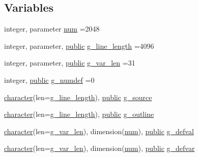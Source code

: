 \subsection*{Variables}
\begin{DoxyCompactItemize}
\item 
integer, parameter \hyperlink{namespacem__fpp_adaa4b6694f65973ef728ad2189a8e6f2}{num} =2048
\item 
integer, parameter, \hyperlink{M__stopwatch_83_8txt_a2f74811300c361e53b430611a7d1769f}{public} \hyperlink{namespacem__fpp_ab93f8756cf248cf8db932573009d4664}{g\+\_\+line\+\_\+length} =4096
\item 
integer, parameter, \hyperlink{M__stopwatch_83_8txt_a2f74811300c361e53b430611a7d1769f}{public} \hyperlink{namespacem__fpp_a99c57ea4a304975a7afafcf0b292db06}{g\+\_\+var\+\_\+len} =31
\item 
integer, \hyperlink{M__stopwatch_83_8txt_a2f74811300c361e53b430611a7d1769f}{public} \hyperlink{namespacem__fpp_a59fae4b75a68fde011c594b60e4b92a5}{g\+\_\+numdef} =0
\item 
\hyperlink{option__stopwatch_83_8txt_abd4b21fbbd175834027b5224bfe97e66}{character}(len=\hyperlink{namespacem__fpp_ab93f8756cf248cf8db932573009d4664}{g\+\_\+line\+\_\+length}), \hyperlink{M__stopwatch_83_8txt_a2f74811300c361e53b430611a7d1769f}{public} \hyperlink{namespacem__fpp_a6e0e464a1765a84236cdda423119523b}{g\+\_\+source}
\item 
\hyperlink{option__stopwatch_83_8txt_abd4b21fbbd175834027b5224bfe97e66}{character}(len=\hyperlink{namespacem__fpp_ab93f8756cf248cf8db932573009d4664}{g\+\_\+line\+\_\+length}), \hyperlink{M__stopwatch_83_8txt_a2f74811300c361e53b430611a7d1769f}{public} \hyperlink{namespacem__fpp_a7d195a44ce2fda4dc4f152fd174f0a86}{g\+\_\+outline}
\item 
\hyperlink{option__stopwatch_83_8txt_abd4b21fbbd175834027b5224bfe97e66}{character}(len=\hyperlink{namespacem__fpp_a99c57ea4a304975a7afafcf0b292db06}{g\+\_\+var\+\_\+len}), dimension(\hyperlink{namespacem__fpp_adaa4b6694f65973ef728ad2189a8e6f2}{num}), \hyperlink{M__stopwatch_83_8txt_a2f74811300c361e53b430611a7d1769f}{public} \hyperlink{namespacem__fpp_a1a99b8d1526c19ed196bc1c1ba53ba4c}{g\+\_\+defval}
\item 
\hyperlink{option__stopwatch_83_8txt_abd4b21fbbd175834027b5224bfe97e66}{character}(len=\hyperlink{namespacem__fpp_a99c57ea4a304975a7afafcf0b292db06}{g\+\_\+var\+\_\+len}), dimension(\hyperlink{namespacem__fpp_adaa4b6694f65973ef728ad2189a8e6f2}{num}), \hyperlink{M__stopwatch_83_8txt_a2f74811300c361e53b430611a7d1769f}{public} \hyperlink{namespacem__fpp_a07ee856eed5841b997794fe7c37bfed6}{g\+\_\+defvar}

\end{DoxyCompactItemize}
